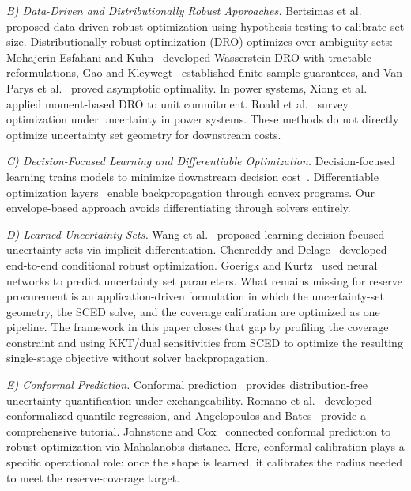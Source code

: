 \documentclass[11pt]{article}
\theoremstyle{definition}
\begin{document}
\emph{B) Data-Driven and Distributionally Robust Approaches.}
Bertsimas et al.~\citep{bertsimas2018datadriven} proposed data-driven robust optimization using hypothesis testing to calibrate set size. Distributionally robust optimization (DRO) optimizes over ambiguity sets: Mohajerin Esfahani and Kuhn~\citep{esfahani2018data} developed Wasserstein DRO with tractable reformulations, Gao and Kleywegt~\citep{gao2023distributionally} established finite-sample guarantees, and Van Parys et al.~\citep{vanparys2021data} proved asymptotic optimality. In power systems, Xiong et al.~\citep{xiong2017distributionally} applied moment-based DRO to unit commitment. Roald et al.~\citep{roald2023power} survey optimization under uncertainty in power systems. These methods do not directly optimize uncertainty set geometry for downstream costs.

\emph{C) Decision-Focused Learning and Differentiable Optimization.}
Decision-focused learning trains models to minimize downstream decision cost~\citep{elmachtoub2022smart,donti2017task}. Differentiable optimization layers~\citep{amos2017optnet,agrawal2019differentiable,bolte2021nonsmooth} enable backpropagation through convex programs. Our envelope-based approach avoids differentiating through solvers entirely.

\emph{D) Learned Uncertainty Sets.}
Wang et al.~\citep{wang2023learning} proposed learning decision-focused uncertainty sets via implicit differentiation. Chenreddy and Delage~\citep{chenreddy2024end} developed end-to-end conditional robust optimization. Goerigk and Kurtz~\citep{goerigk2023data} used neural networks to predict uncertainty set parameters. What remains missing for reserve procurement is an application-driven formulation in which the uncertainty-set geometry, the SCED solve, and the coverage calibration are optimized as one pipeline. The framework in this paper closes that gap by profiling the coverage constraint and using KKT/dual sensitivities from SCED to optimize the resulting single-stage objective without solver backpropagation.

\emph{E) Conformal Prediction.}
Conformal prediction~\citep{vovk2005algorithmic} provides distribution-free uncertainty quantification under exchangeability. Romano et al.~\citep{romano2019conformalized} developed conformalized quantile regression, and Angelopoulos and Bates~\citep{angelopoulos2023conformal} provide a comprehensive tutorial. Johnstone and Cox~\citep{johnstone2021conformal} connected conformal prediction to robust optimization via Mahalanobis distance. Here, conformal calibration plays a specific operational role: once the shape is learned, it calibrates the radius needed to meet the reserve-coverage target.
\end{document}
